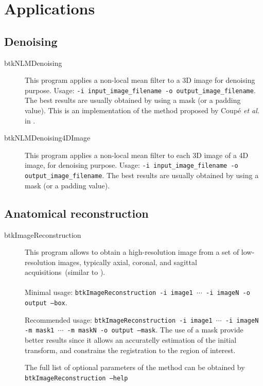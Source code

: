 \section{Applications}

\subsection{Denoising \cite{coupe_2008}}

\begin{description}
 \item[btkNLMDenoising] This program applies a non-local mean filter to a 3D
image  for denoising purpose. Usage: \texttt{-i input\_image\_filename -o
output\_image\_filename}. The best results are usually obtained by using a mask
(or a padding value). This is an implementation of the method proposed by Coup\'e \textit{et al.} in \cite{coupe_2008}.
\end{description}

\begin{description}
 \item[btkNLMDenoising4DImage] This program applies a non-local mean filter to 
 each 3D image of a 4D image, for denoising purpose. Usage: \texttt{-i
input\_image\_filename -o output\_image\_filename}. The best results are usually
obtained by using a mask (or a padding value).
\end{description}


\subsection{Anatomical reconstruction}
\label{subsec:ana_rec}

\begin{description}
 \item[btkImageReconstruction] This program allows to obtain a
high-resolution image from a set of low-resolution images, typically
axial, coronal, and sagittal acquisitions~(similar to \cite{rousseau_registration_2006}). \\\\
Minimal usage: \texttt{btkImageReconstruction -i image1 $\cdots$ -i imageN -o
output --box}. 

Recommended usage: \texttt{btkImageReconstruction -i image1 $\cdots$ -i imageN
-m mask1 $\cdots$ -m maskN -o output --mask}. The use of a mask provide
better results since it allows an accuratelly estimation of the initial
transform, and constrains the registration to the region of interest.

The full list of optional parameters of the method can be obtained by
\texttt{btkImageReconstruction --help}

\end{description}

